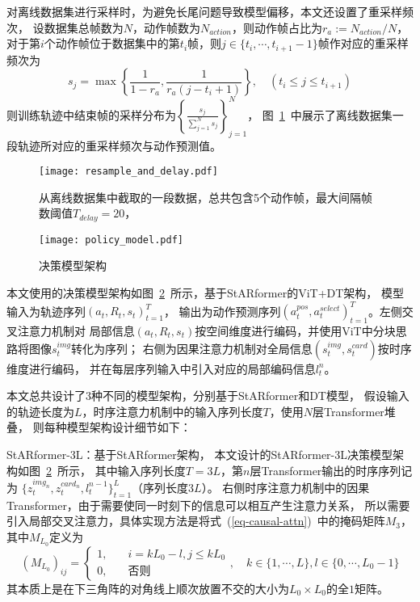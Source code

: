 对离线数据集进行采样时，为避免长尾问题导致模型偏移，本文还设置了重采样频次，
设数据集总帧数为$N$，动作帧数为$N_{action}$，则动作帧占比为$r_a:=N_{action} / N$，
对于第$i$个动作帧位于数据集中的第$t_i$帧，则$j\in\{t_{i},\cdots,t_{i+1}-1\}$帧作对应的重采样频次为
\begin{equation}\label{eq-resample-freq}
  s_j = \max\left\{\frac{1}{1-r_a}, \frac{1}{r_a(j-t_i+1)}\right\},\quad (t_i\leqslant j\leqslant t_{i+1})
\end{equation}
则训练轨迹中结束帧的采样分布为$\left\{\frac{s_j}{\sum_{j=1}^{N}s_j}\right\}_{j=1}^N$，
图~\ref{fig-resample-and-delay}~中展示了离线数据集一段轨迹所对应的重采样频次与动作预测值。
\begin{figure}[htbp]
  \centering
  \texttt{[image: resample\_and\_delay.pdf]}
  \caption{从离线数据集中截取的一段数据，总共包含5个动作帧，最大间隔帧数阈值$T_{delay} = 20$，}\label{fig-resample-and-delay}
\end{figure}

\label{sec-model-struct}
\begin{figure}[htbp]
  \centering\vspace{-2ex}
  \texttt{[image: policy\_model.pdf]}
  \caption{决策模型架构}
  \label{fig-model}
\end{figure}

本文使用的决策模型架构如图~\ref{fig-model}~所示，基于StARformer的ViT+DT架构，
模型输入为轨迹序列$(a_t, R_t, s_t)_{t=1}^T$，
输出为动作预测序列$(a_t^{pos},a_t^{select})_{t=1}^T$。左侧交叉注意力机制对
局部信息$(a_t,R_t,s_t)$按空间维度进行编码，并使用ViT中分块思路将图像$s_t^{img}$转化为序列；
右侧为因果注意力机制对全局信息$(s^{img}_t,s^{card}_t)$按时序维度进行编码，
并在每层序列输入中引入对应的局部编码信息$l_t^{n}$。

本文总共设计了3种不同的模型架构，分别基于StARformer和DT模型，
假设输入的轨迹长度为$L$，时序注意力机制中的输入序列长度$T$，使用$N$层Transformer堆叠，
则每种模型架构设计细节如下：

StARformer-3L：基于StARformer架构，
本文设计的StARformer-3L决策模型架构如图~\ref{fig-model}~所示，
其中输入序列长度$T=3L$，第$n$层Transformer输出的时序序列记为
$\{z_t^{img_n},z_t^{card_n},l_{t}^{n-1}\}_{t=1}^{L}$（序列长度$3L$）。
右侧时序注意力机制中的因果Transformer，由于需要使同一时刻下的信息可以相互产生注意力关系，
所以需要引入局部交叉注意力，具体实现方法是将式~(\ref{eq-causal-attn})~中的掩码矩阵$M_{3}$，其中$M_{L_0}$定义为
\begin{equation}
  (M_{L_0})_{ij} = \begin{cases}
    1, &\quad i=kL_0-l,j\leqslant kL_0\\
    0, &\quad \text{否则}
  \end{cases},\quad k\in\{1,\cdots,L\}, l\in\{0,\cdots,L_0-1\}
\end{equation}
其本质上是在下三角阵的对角线上顺次放置不交的大小为$L_0\times L_0$的全$1$矩阵。

